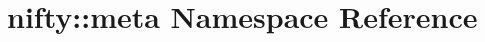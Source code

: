 \hypertarget{namespacenifty_1_1meta}{}\section{nifty\+:\+:meta Namespace Reference}
\label{namespacenifty_1_1meta}
